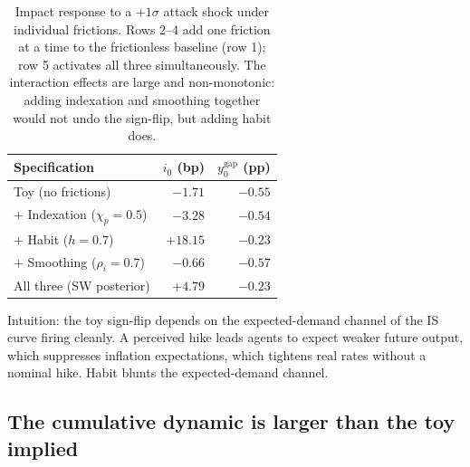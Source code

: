 \documentclass[12pt]{article}
\begin{document}
\begin{table}[h]
\centering
\small
\begin{tabular}{lrr}
\toprule
Specification & \(i_0\) (bp) & \(y^{\text{gap}}_0\) (pp) \\
\midrule
Toy (no frictions) & \(-1.71\) & \(-0.55\) \\
{}+ Indexation (\(\chi_p = 0.5\)) & \(-3.28\) & \(-0.54\) \\
{}+ Habit (\(h = 0.7\)) & \(+18.15\) & \(-0.23\) \\
{}+ Smoothing (\(\rho_i = 0.7\)) & \(-0.66\) & \(-0.57\) \\
All three (SW posterior) & \(+4.79\) & \(-0.23\) \\
\bottomrule
\end{tabular}
\caption{Impact response to a \(+1\sigma\) attack shock under individual frictions. Rows 2--4 add one friction at a time to the frictionless baseline (row 1); row 5 activates all three simultaneously. The interaction effects are large and non-monotonic: adding indexation and smoothing together would not undo the sign-flip, but adding habit does.}
\label{tab:frictions}
\end{table}

Intuition: the toy sign-flip depends on the expected-demand channel of the IS curve firing cleanly. A perceived hike leads agents to expect weaker future output, which suppresses inflation expectations, which tightens real rates without a nominal hike. Habit blunts the expected-demand channel.

\subsection{The cumulative dynamic is larger than the toy implied}
\end{document}
